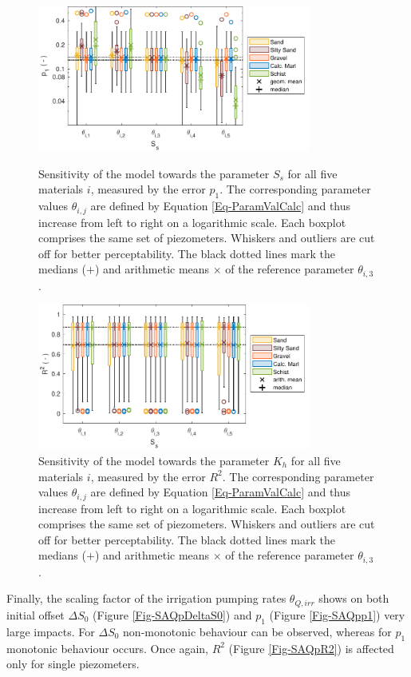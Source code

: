 \begin{figure}[p]
    \centering
    \includegraphics[width=0.8\textwidth]{./img/Fig-SensAna-S_s-p_1.pdf}
    \caption{Sensitivity of the model towards the parameter $S_s$ for all five materials $i$, measured by the error $p_1$. The corresponding parameter values $\theta_{i,j}$ are defined by Equation \eqref{Eq-ParamValCalc} and thus increase from left to right on a logarithmic scale. Each boxplot comprises the same set of piezometers. Whiskers and outliers are cut off for better perceptability. The black dotted lines mark the medians ($\bm{+}$) and arithmetic means $\bm{\times}$ of the reference parameter $\theta_{i,3}$.}
    \label{Fig-SASsp1}
    
    \includegraphics[width=0.8\textwidth]{./img/Fig-SensAna-S_s-R^2.pdf}
    \caption{Sensitivity of the model towards the parameter $K_h$ for all five materials $i$, measured by the error $R^2$. The corresponding parameter values $\theta_{i,j}$ are defined by Equation \eqref{Eq-ParamValCalc} and thus increase from left to right on a logarithmic scale. Each boxplot comprises the same set of piezometers. Whiskers and outliers are cut off for better perceptability. The black dotted lines mark the medians ($\bm{+}$) and arithmetic means $\bm{\times}$ of the reference parameter $\theta_{i,3}$.}
    \label{Fig-SASsR2}
\end{figure}

Finally, the scaling factor of the irrigation pumping rates $\theta_{Q,irr}$ shows on both initial offset $\Delta S_0$ (Figure \ref{Fig-SAQpDeltaS0}) and $p_1$ (Figure \ref{Fig-SAQpp1}) very large impacts. 
For $\Delta S_0$ non-monotonic behaviour can be observed, whereas for $p_1$ monotonic behaviour occurs. 
Once again, $R^2$ (Figure \ref{Fig-SAQpR2}) is affected only for single piezometers.

